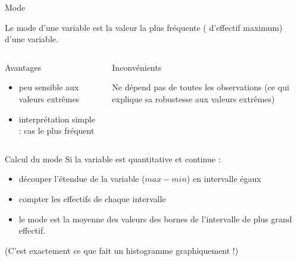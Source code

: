 \documentclass{beamer}
\begin{document}
\begin{frame}{Mode}


Le \alert{mode} d’une variable est la valeur la plus \alert{fréquente} ( d’effectif maximum) d’une variable.



\begin{columns}[T,onlytextwidth]
\begin{block}{Avantages}
\begin{spacing}{0.9}
\begin{itemize}
  \item peu sensible aux valeurs extrêmes 
  \item interprétation  simple : cas le plus fréquent
\end{itemize}
\end{spacing}
\end{block}
\begin{block}{Inconvénients}
\begin{spacing}{0.9}
Ne dépend pas de toutes les observations (ce qui explique sa robustesse aux valeurs extrêmes)
\end{spacing}
\end{block}
\end{columns}




\end{frame}



\begin{frame}{Calcul du mode}
Si la variable est quantitative et continue : 
\begin{itemize}
  \item découper l’étendue de la variable ($max -min$) en intervalle égaux
  \item compter les effectifs de chaque intervalle
  \item le mode est la moyenne des valeurs des bornes de l'intervalle de plus grand effectif.
\end{itemize}

\begin{tiny}
(C’est exactement ce que fait un histogramme graphiquement !)
\end{tiny}

\end{frame}
\end{document}

